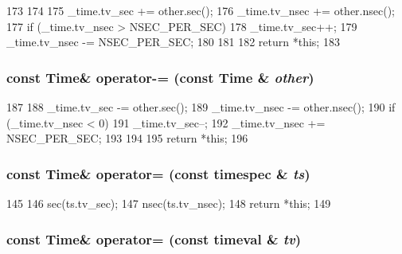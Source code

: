 \begin{DoxyCode}
173     {
174 
175         _time.tv_sec += other.sec();
176         _time.tv_nsec += other.nsec();
177         if (_time.tv_nsec > NSEC_PER_SEC) {
178             _time.tv_sec++;
179             _time.tv_nsec -= NSEC_PER_SEC;
180         }
181 
182         return *this;
183     }
\end{DoxyCode}
\hypertarget{classTime_ab8c305be453d8ac1de1ca0e63e432e23}{
\subsubsection[{operator-\/=}]{\setlength{\rightskip}{0pt plus 5cm}const {\bf Time}\& operator-\/= (const {\bf Time} \& {\em other})}}
\label{classTime_ab8c305be453d8ac1de1ca0e63e432e23}



\begin{DoxyCode}
187     {
188         _time.tv_sec -= other.sec();
189         _time.tv_nsec -= other.nsec();
190         if (_time.tv_nsec < 0) {
191             _time.tv_sec--;
192             _time.tv_nsec += NSEC_PER_SEC;
193         }
194 
195         return *this;
196     }
\end{DoxyCode}
\hypertarget{classTime_ae4bb08a6674a58ebc62739623789e5ae}{
\subsubsection[{operator=}]{\setlength{\rightskip}{0pt plus 5cm}const {\bf Time}\& operator= (const timespec \& {\em ts})}}
\label{classTime_ae4bb08a6674a58ebc62739623789e5ae}



\begin{DoxyCode}
145     {
146         sec(ts.tv_sec);
147         nsec(ts.tv_nsec);
148         return *this;
149     }
\end{DoxyCode}
\hypertarget{classTime_a00647d918479df3a472753197e8867d3}{
\subsubsection[{operator=}]{\setlength{\rightskip}{0pt plus 5cm}const {\bf Time}\& operator= (const timeval \& {\em tv})}}
\label{classTime_a00647d918479df3a472753197e8867d3}



